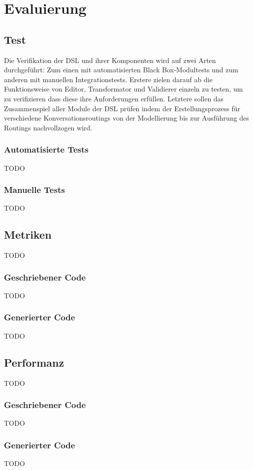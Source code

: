 \chapter{Evaluierung}

\section{Test}
Die Verifikation der DSL und ihrer Komponenten wird auf zwei Arten durchgeführt: Zum einen mit automatisierten Black Box-Modultests und zum anderen mit manuellen Integrationstests. Erstere zielen darauf ab die Funktionsweise von Editor, Transformator und Validierer einzeln zu testen, um zu verifizieren dass diese ihre Anforderungen erfüllen. Letztere sollen das Zusammenspiel aller Module der DSL prüfen indem der Erstellungsprozess für verschiedene Konversationsroutings von der Modellierung bis zur Ausführung des Routings nachvollzogen wird.

\subsection{Automatisierte Tests}
TODO

\subsection{Manuelle Tests}
TODO

\section{Metriken}
TODO

\subsection{Geschriebener Code}
TODO

\subsection{Generierter Code}
TODO

\section{Performanz}
TODO

\subsection{Geschriebener Code}
TODO

\subsection{Generierter Code}
TODO

